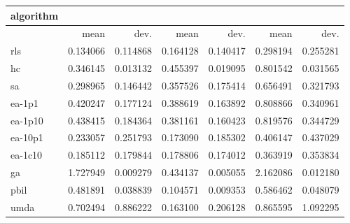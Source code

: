 \begin{tabular}{@{}l*{6}{>{{}}N{1}{2}}@{}}
\toprule
{algorithm} &  &  &  \\
\midrule
& {mean} & {dev.} & {mean} & {dev.} & {mean} & {dev.} \\
\midrule
rls & 0.134066 & 0.114868 & 0.164128 & 0.140417 & 0.298194 & 0.255281 \\
 hc & 0.346145 & 0.013132 & 0.455397 & 0.019095 & 0.801542 & 0.031565 \\
 sa & 0.298965 & 0.146442 & 0.357526 & 0.175414 & 0.656491 & 0.321793 \\
 ea-1p1 & 0.420247 & 0.177124 & 0.388619 & 0.163892 & 0.808866 & 0.340961 \\
 ea-1p10 & 0.438415 & 0.184364 & 0.381161 & 0.160423 & 0.819576 & 0.344729 \\
 ea-10p1 & 0.233057 & 0.251793 & 0.173090 & 0.185302 & 0.406147 & 0.437029 \\
 ea-1c10 & 0.185112 & 0.179844 & 0.178806 & 0.174012 & 0.363919 & 0.353834 \\
 ga & 1.727949 & 0.009279 & 0.434137 & 0.005055 & 2.162086 & 0.012180 \\
 pbil & 0.481891 & 0.038839 & 0.104571 & 0.009353 & 0.586462 & 0.048079 \\
 umda & 0.702494 & 0.886222 & 0.163100 & 0.206128 & 0.865595 & 1.092295 \\
 \bottomrule
\end{tabular}
